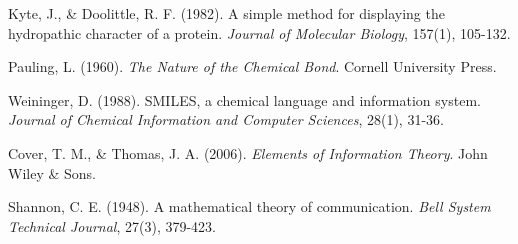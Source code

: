 \documentclass[12pt,a4paper]{article}
\begin{document}

\begin{thebibliography}{99}

Kyte, J., \& Doolittle, R. F. (1982). A simple method for displaying the hydropathic character of a protein. \textit{Journal of Molecular Biology}, 157(1), 105-132.

Pauling, L. (1960). \textit{The Nature of the Chemical Bond}. Cornell University Press.

Weininger, D. (1988). SMILES, a chemical language and information system. \textit{Journal of Chemical Information and Computer Sciences}, 28(1), 31-36.

Cover, T. M., \& Thomas, J. A. (2006). \textit{Elements of Information Theory}. John Wiley \& Sons.

Shannon, C. E. (1948). A mathematical theory of communication. \textit{Bell System Technical Journal}, 27(3), 379-423.

\end{thebibliography}
\end{document}
